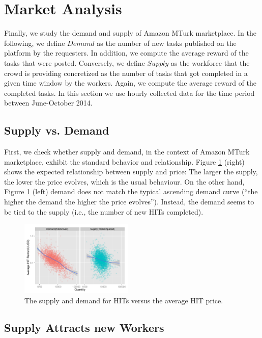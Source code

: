\section{Market Analysis}
\label{sec:market}
Finally, we study the demand and supply of Amazon MTurk marketplace. In the following, we define $Demand$ as the number of new tasks published on the platform by the requesters. In addition, we compute the average reward of the tasks that were posted. Conversely, we define $Supply$ as the workforce that the crowd is providing concretized as the number of tasks that got completed in a given time window by the workers. Again, we compute the average reward of the completed tasks.
In this section we use hourly collected data for the time period between June-October 2014.

\subsection{Supply vs. Demand}
First, we check whether supply and demand, in the context of Amazon MTurk marketplace, exhibit the standard behavior and relationship.
Figure \ref{fig:dsup} (right) shows the expected relationship between supply and price: The larger the supply, the lower the price evolves, which is the usual behaviour. On the other hand, Figure \ref{fig:dsup} (left) demand does not match the typical ascending demand curve (``the higher the demand the higher the price evolves''). Instead, the demand seems to be tied to the supply (i.e., the number of new HITs completed).

\begin{figure}[t!]
	\centering
		\includegraphics[width=0.48\textwidth]{figures/ds}
	\caption{The supply and demand for HITs versus the average HIT price.}
	\label{fig:dsup}
\end{figure}

\subsection{Supply Attracts new Workers} %


